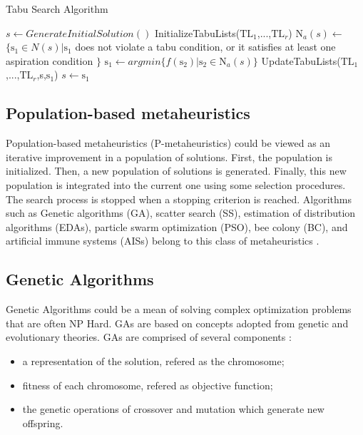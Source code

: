 \begin{algorithm}[h]
  \caption{Tabu Search Algorithm}\label{tsa}
  \begin{algorithmic}[2]
    
    \State $s\gets GenerateInitialSolution()$
    \State InitializeTabuLists($\mbox{TL}_1$,...,$\mbox{TL}_r$)
    \State $\mbox{N}_a(s)\gets$ $\{\mbox{s}_1 \in N(s) |\mbox{s}_1$ does not violate a tabu condition, or it satisfies at least one aspiration condition $\}$ 
    \State $\mbox{s}_1\gets argmin\{f(\mbox{s}_2)|\mbox{s}_2 \in \mbox{N}_a(s) \}$
    \State UpdateTabuLists($\mbox{TL}_1$,...,$\mbox{TL}_r$,s,$\mbox{s}_1$)
    \State $s\gets \mbox{s}_1$
    \EndWhile
      
  \end{algorithmic}
\end{algorithm}

\subsection{Population-based metaheuristics}

Population-based metaheuristics (P-metaheuristics) could be viewed as an iterative improvement in a population of solutions. First, the population is initialized. Then, a new population of solutions is generated. Finally, this new population is integrated into the current one using some selection procedures. The search process is stopped when a stopping criterion is reached. Algorithms such as Genetic algorithms (GA), scatter search (SS), estimation of distribution algorithms (EDAs), particle swarm optimization (PSO), bee colony (BC), and artificial immune systems (AISs) belong to this class of metaheuristics \citep{talbi2009metaheuristics}. 

\subsection{Genetic Algorithms}

Genetic Algorithms could be a mean of solving complex optimization problems that are often NP Hard. GAs are based on concepts adopted from genetic and evolutionary theories. GAs are comprised of several components \citep{hong2000simultaneously} \citep{shousha2003performance} :

\begin{itemize}
\item a representation of the solution, refered as the chromosome;
\item fitness of each chromosome, refered as objective function;
\item the genetic operations of crossover and mutation which generate new offspring. 
\end{itemize}


